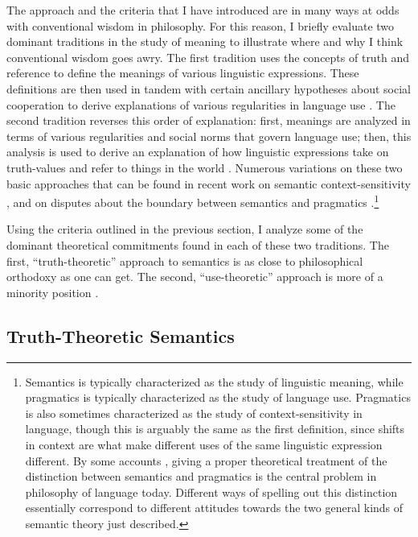 The approach and the criteria that I have introduced are in many ways at odds with conventional wisdom in philosophy. For this reason, I briefly evaluate two dominant traditions in the study of meaning to illustrate where and why I think conventional wisdom goes awry. The first tradition uses the concepts of truth and reference to define the meanings of various linguistic expressions. These definitions are then used in tandem with certain ancillary hypotheses about social cooperation to derive explanations of various regularities in language use \citep[e.g.,][]{Soames:2010,Lewis:1970,Lewis:1975,Davidson:1967,CappelenLepore:2005,Grice:1975}. The second tradition reverses this order of explanation: first, meanings are analyzed in terms of various regularities and social norms that govern language use; then, this analysis is used to derive an explanation of how linguistic expressions take on truth-values and refer to things in the world \citep[e.g.,][]{Wittgenstein:1953,Brandom:1994,Brandom:2000,Horwich:2005,Sellars:1953}. Numerous variations on these two basic approaches that can be found in recent work on semantic context-sensitivity \citep{Recanati:2004,CappelenLepore:2005}, and on disputes about the boundary between semantics and pragmatics \citep{Brandom:2000,Recanati:2012}.\footnote{Semantics is typically characterized as the study of linguistic meaning, while pragmatics is typically characterized as the study of language use. Pragmatics is also sometimes characterized as the study of context-sensitivity in language, though this is arguably the same as the first definition, since shifts in context are what make different uses of the same linguistic expression different. By some accounts \citep[e.g.,][]{CappelenLepore:2005}, giving a proper theoretical treatment of the distinction between semantics and pragmatics is the central problem in philosophy of language today. Different ways of spelling out this distinction essentially correspond to different attitudes towards the two general kinds of semantic theory just described.}

Using the criteria outlined in the previous section, I analyze some of the dominant theoretical commitments found in each of these two traditions. The first, ``truth-theoretic'' approach to semantics is as close to philosophical orthodoxy as one can get. The second, ``use-theoretic'' approach is more of a minority position \citep{Stanley:2008,Brandom:1994}.

\subsection{Truth-Theoretic Semantics}

